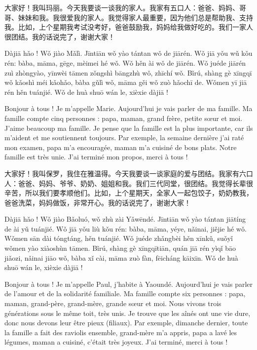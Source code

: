 \documentclass[11pt]{article}
\begin{document}
\begin{textebox}
大家好！我叫玛丽。今天我要谈一谈我的家人。我家有五口人：爸爸、妈妈、哥哥、妹妹和我。我很爱我的家人。我觉得家人最重要，因为他们总是帮助我、支持我。比如，上个星期我考试没考好，爸爸鼓励我，妈妈给我做好吃的。我们一家人很团结。我的话说完了，谢谢大家！
\par\medskip
Dàjiā hǎo ! Wǒ jiào Mǎlì. Jīntiān wǒ yào tántan wǒ de jiārén. Wǒ jiā yǒu wǔ kǒu rén: bàba, māma, gēge, mèimei hé wǒ. Wǒ hěn ài wǒ de jiārén. Wǒ juéde jiārén zuì zhòngyào, yīnwèi tāmen zǒngshì bāngzhù wǒ, zhīchí wǒ. Bǐrú, shàng gè xīngqī wǒ kǎoshì méi kǎohǎo, bàba gǔlì wǒ, māma gěi wǒ zuò hǎochī de. Wǒmen yī jiā rén hěn tuánjié. Wǒ de huà shuō wán le, xièxie dàjiā !
\par\medskip
Bonjour à tous ! Je m'appelle Marie. Aujourd'hui je vais parler de ma famille. Ma famille compte cinq personnes : papa, maman, grand frère, petite sœur et moi. J'aime beaucoup ma famille. Je pense que la famille est la plus importante, car ils m'aident et me soutiennent toujours. Par exemple, la semaine dernière j'ai raté mon examen, papa m'a encouragée, maman m'a cuisiné de bons plats. Notre famille est très unie. J'ai terminé mon propos, merci à tous !
\end{textebox}

\begin{textebox}
大家好！我叫保罗，我住在雅温得。今天我要谈一谈家庭的爱与团结。我家有六口人：爸爸、妈妈、爷爷、奶奶、姐姐和我。我们三代同堂，很团结。我觉得长辈很辛苦，所以我们要孝顺他们。比如，上个星期天，全家人一起包饺子，奶奶教我，爸爸洗菜，妈妈做饭，非常开心。我的话说完了，谢谢大家！
\par\medskip
Dàjiā hǎo ! Wǒ jiào Bǎoluó, wǒ zhù zài Yǎwēndé. Jīntiān wǒ yào tántan jiātíng de ài yǔ tuánjié. Wǒ jiā yǒu liù kǒu rén: bàba, māma, yéye, nǎinai, jiějie hé wǒ. Wǒmen sān dài tóngtáng, hěn tuánjié. Wǒ juéde zhǎngbèi hěn xīnkǔ, suǒyǐ wǒmen yào xiàoshùn tāmen. Bǐrú, shàng gè xīngqītiān, quán jiā rén yìqǐ bāo jiǎozi, nǎinai jiāo wǒ, bàba xǐ cài, māma zuò fàn, fēicháng kāixīn. Wǒ de huà shuō wán le, xièxie dàjiā !
\par\medskip
Bonjour à tous ! Je m'appelle Paul, j'habite à Yaoundé. Aujourd'hui je vais parler de l'amour et de la solidarité familiale. Ma famille compte six personnes : papa, maman, grand-père, grand-mère, grande sœur et moi. Nous vivons trois générations sous le même toit, très unis. Je trouve que les aînés ont une vie dure, donc nous devons leur être pieux (filiaux). Par exemple, dimanche dernier, toute la famille a fait des raviolis ensemble, grand-mère m'a appris, papa a lavé les légumes, maman a cuisiné, c'était très joyeux. J'ai terminé, merci à tous !
\end{textebox}
\end{document}
